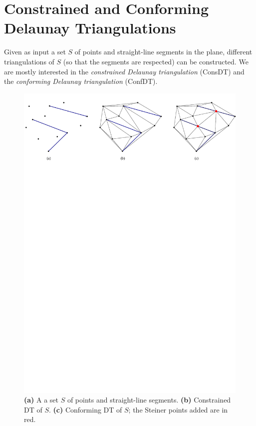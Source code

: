 \section{Constrained and Conforming Delaunay Triangulations}

Given as input a set $S$ of points and straight-line segments in the plane, different triangulations of $S$ (so that the segments are respected) can be constructed. 
We are mostly interested in the \emph{constrained Delaunay triangulation} (ConsDT) and the \emph{conforming Delaunay triangulation} (ConfDT).
\begin{figure}
  \centering
  \includegraphics[width=\linewidth]{figs/cdt_example}
  \caption{\textbf{(a)} A a set $S$ of points and straight-line segments. \textbf{(b)} Constrained DT of $S$. \textbf{(c)} Conforming DT of $S$; the Steiner points added are in red.}
\label{fig:cdt_example}
\end{figure}

